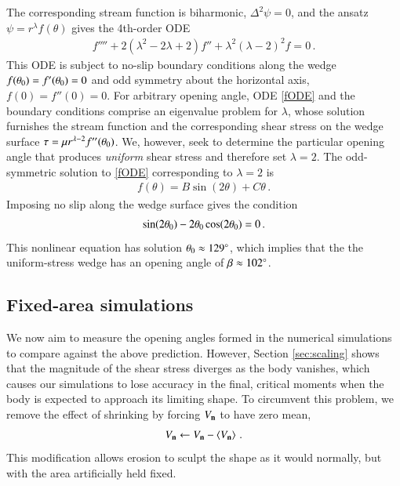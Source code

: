 \documentclass[preprint, 10pt]{elsarticle}
\begin{document}
The corresponding stream function is biharmonic, $\Delta^2 \psi = 0$, and the ansatz $\psi = r^{\lambda}f(\theta)$ gives the 4th-order ODE~\cite{poz1997}
\begin{align}
\label{fODE}
f'''' + 2(\lambda^2 - 2 \lambda + 2)f'' + \lambda^2(\lambda-2)^2 f = 0 \, .
\end{align}
This ODE is subject to no-slip boundary conditions along the wedge $f(\theta_0) = f'(\theta_0) = 0$ and odd symmetry about the horizontal axis, $f(0) = f''(0) = 0$. For arbitrary opening angle, ODE \eqref{fODE} and the boundary conditions comprise an eigenvalue problem for $\lambda$, whose solution furnishes the stream function and the corresponding shear stress on the wedge surface $\tau = \mu r^{\lambda-2} f''(\theta_0)$. We, however, seek to determine the particular opening angle that produces {\em uniform} shear stress and therefore set $\lambda = 2$.
The odd-symmetric solution to \eqref{fODE} corresponding to $\lambda=2$ is
\begin{align}
  f(\theta) = B \sin (2 \theta) + C \theta \, .
\end{align}
Imposing no slip along the wedge surface gives the condition
\begin{align}
  \sin(2 \theta_0) - 2 \theta_0 \cos(2 \theta_0) = 0 \, .
\end{align}
This nonlinear equation has solution $\theta_0 \approx 129^\circ$, which implies that the the uniform-stress wedge has an opening angle of $\beta \approx 102^\circ$.


\subsection{Fixed-area simulations}

We now aim to measure the opening angles formed in the numerical simulations to compare against the above prediction. However, Section \ref{sec:scaling} shows that the magnitude of the shear stress diverges as the body vanishes, which causes our simulations to lose accuracy in the final, critical moments when the body is expected to approach its limiting shape. To circumvent this problem, we remove the effect of shrinking by forcing $V_{\mathbf{n}}$ to have zero mean,
\begin{align}
V_{\mathbf{n}} \leftarrow V_{\mathbf{n}} - \left< V_{\mathbf{n}} \right> \, .
\end{align}
This modification allows erosion to sculpt the shape as it would normally, but with the area artificially held fixed.
\end{document}
